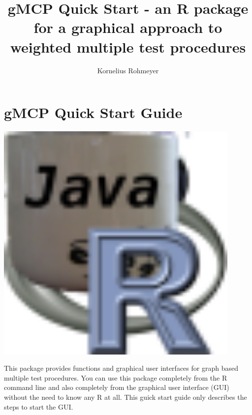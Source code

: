 \documentclass[a4paper, 11pt]{article}\usepackage[]{graphicx}\usepackage[]{color}
\begin{document}

\title{gMCP Quick Start - an R package for a graphical approach to weighted multiple test procedures} 

\author{Kornelius Rohmeyer}






\section*{gMCP Quick Start Guide}

\begin{minipage}{0.10\textwidth}
\includegraphics[width=0.9\textwidth]{pictures/rjavaicon64.png}
\end{minipage}
\begin{minipage}{0.90\textwidth}

This package provides functions and graphical user interfaces for graph based
multiple test procedures.
You can use this package completely from the R command line and also completely
from the graphical user interface (GUI) without the need to know any R at all.
This guick start guide only describes the steps to start the GUI.

\end{minipage}
\end{document}
